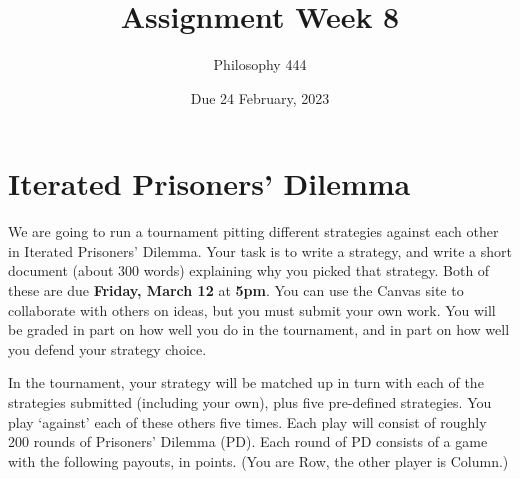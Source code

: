 \documentclass[
  11pt,
]{article}
\title{Assignment Week 8}
\author{Philosophy 444}
\date{Due 24 February, 2023}
\begin{document}
\maketitle

\hypertarget{iterated-prisoners-dilemma}{%
\section{Iterated Prisoners' Dilemma}\label{iterated-prisoners-dilemma}}

We are going to run a tournament pitting different strategies against
each other in Iterated Prisoners' Dilemma. Your task is to write a
strategy, and write a short document (about 300 words) explaining why
you picked that strategy. Both of these are due \textbf{Friday, March
12} at \textbf{5pm}. You can use the Canvas site to collaborate with
others on ideas, but you must submit your own work. You will be graded
in part on how well you do in the tournament, and in part on how well
you defend your strategy choice.

In the tournament, your strategy will be matched up in turn with each of
the strategies submitted (including your own), plus five pre-defined
strategies. You play `against' each of these others five times. Each
play will consist of roughly 200 rounds of Prisoners' Dilemma (PD). Each
round of PD consists of a game with the following payouts, in points.
(You are Row, the other player is Column.)

 
  \providecommand{\huxb}[2]{\arrayrulecolor[RGB]{#1}\global\arrayrulewidth=#2pt}
  \providecommand{\huxvb}[2]{\color[RGB]{#1}\vrule width #2pt}
  \providecommand{\huxtpad}[1]{\rule{0pt}{#1}}
  \providecommand{\huxbpad}[1]{\rule[-#1]{0pt}{#1}}
\end{document}
